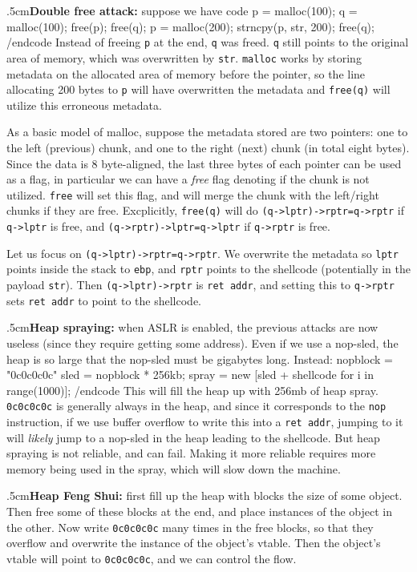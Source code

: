 \quitvmode\kern.5cm{\bf Double free attack:} suppose we have code
\begincode
p = malloc(100); q = malloc(100);
free(p); free(q);
p = malloc(200);
strncpy(p, str, 200);
free(q);
/endcode
Instead of freeing {\tt p} at the end, {\tt q} was freed.
{\tt q} still points to the original area of memory, which was overwritten by {\tt str}.
{\tt malloc} works by storing metadata on the allocated area of memory before the pointer, so the line allocating 200 bytes to {\tt p} will have overwritten the metadata and {\tt free(q)} will utilize this
erroneous metadata.

As a basic model of malloc, suppose the metadata stored are two pointers: one to the left (previous) chunk, and one to the right (next) chunk (in total eight bytes).
Since the data is 8 byte-aligned, the last three bytes of each pointer can be used as a flag, in particular we can have a {\it free} flag denoting if the chunk is not utilized.
{\tt free} will set this flag, and will merge the chunk with the left/right chunks if they are free.
Excplicitly, {\tt free(q)} will do {\tt (q->lptr)->rptr=q->rptr} if {\tt q->lptr} is free, and {\tt (q->rptr)->lptr=q->lptr} if {\tt q->rptr} is free.

Let us focus on {\tt (q->lptr)->rptr=q->rptr}.
We overwrite the metadata so {\tt lptr} points inside the stack to {\tt ebp}, and {\tt rptr} points to the shellcode (potentially in the payload {\tt str}).
Then {\tt (q->lptr)->rptr} is {\tt ret addr}, and setting this to {\tt q->rptr} sets {\tt ret addr} to point to the shellcode.

\quitvmode\kern.5cm{\bf Heap spraying:} when ASLR is enabled, the previous attacks are now useless (since they require getting some address).
Even if we use a nop-sled, the heap is so large that the nop-sled must be gigabytes long.
Instead:
\begincode
nopblock = "0c0c0c0c"
sled = nopblock * 256kb;
spray = new [sled + shellcode for i in range(1000)];
/endcode
This will fill the heap up with 256mb of heap spray.
{\tt0c0c0c0c} is generally always in the heap, and since it corresponds to the {\tt nop} instruction, if we use buffer overflow to write this into a {\tt ret addr}, jumping to it will {\it likely} jump to
a nop-sled in the heap leading to the shellcode.
But heap spraying is not reliable, and can fail.
Making it more reliable requires more memory being used in the spray, which will slow down the machine.

\quitvmode\kern.5cm{\bf Heap Feng Shui:} first fill up the heap with blocks the size of some object.
Then free some of these blocks at the end, and place instances of the object in the other.
Now write {\tt 0c0c0c0c} many times in the free blocks, so that they overflow and overwrite the instance of the object's vtable.
Then the object's vtable will point to {\tt0c0c0c0c}, and we can control the flow.

